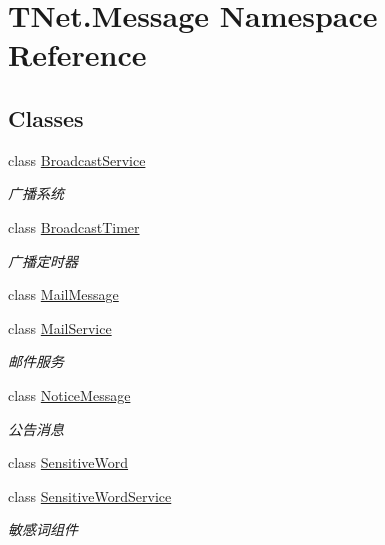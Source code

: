 \hypertarget{namespace_t_net_1_1_message}{}\section{T\+Net.\+Message Namespace Reference}
\label{namespace_t_net_1_1_message}
\subsection*{Classes}
\begin{DoxyCompactItemize}
\item 
class \mbox{\hyperlink{class_t_net_1_1_message_1_1_broadcast_service}{Broadcast\+Service}}
\begin{DoxyCompactList}\small\item\em 广播系统 \end{DoxyCompactList}\item 
class \mbox{\hyperlink{class_t_net_1_1_message_1_1_broadcast_timer}{Broadcast\+Timer}}
\begin{DoxyCompactList}\small\item\em 广播定时器 \end{DoxyCompactList}\item 
class \mbox{\hyperlink{class_t_net_1_1_message_1_1_mail_message}{Mail\+Message}}
\item 
class \mbox{\hyperlink{class_t_net_1_1_message_1_1_mail_service}{Mail\+Service}}
\begin{DoxyCompactList}\small\item\em 邮件服务 \end{DoxyCompactList}\item 
class \mbox{\hyperlink{class_t_net_1_1_message_1_1_notice_message}{Notice\+Message}}
\begin{DoxyCompactList}\small\item\em 公告消息 \end{DoxyCompactList}\item 
class \mbox{\hyperlink{class_t_net_1_1_message_1_1_sensitive_word}{Sensitive\+Word}}
\item 
class \mbox{\hyperlink{class_t_net_1_1_message_1_1_sensitive_word_service}{Sensitive\+Word\+Service}}
\begin{DoxyCompactList}\small\item\em 敏感词组件 \end{DoxyCompactList}\end{DoxyCompactItemize}
